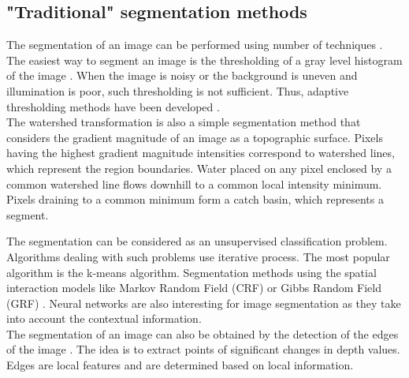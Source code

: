 \subsection{"Traditional" segmentation methods}
The segmentation of an image can be performed using number of techniques \citep{pal1993review}. \\

The easiest way to segment an image is the thresholding of a gray level histogram of the image \citep{taxt1989segmentation}. When the image is noisy or the background is uneven and illumination is poor, such thresholding is not sufficient. Thus, adaptive thresholding methods have been developed \citep{yanowitz1989new}. \\

The watershed transformation is also a simple segmentation method that considers the gradient magnitude of an image as a topographic surface. Pixels having the highest gradient magnitude intensities correspond to watershed lines, which represent the region boundaries. Water placed on any pixel enclosed by a common watershed line flows downhill to a common local intensity minimum. Pixels draining to a common minimum form a catch basin, which represents a segment.

The segmentation can be considered as an unsupervised classification problem. Algorithms dealing with such problems use iterative process. The most popular algorithm is the k-means algorithm. Segmentation methods using the spatial interaction models like Markov Random Field (CRF) \citep{hansen1982image} or Gibbs Random Field (GRF) \citep{derin1987modeling}. Neural networks are also interesting for  image segmentation \citep{ghosh1991image} as they take into account the contextual information. \\

The segmentation of an image can also be obtained by the detection of the edges of the image \citep{peli1982study}. The idea is to extract points of significant changes in depth values. Edges are local features and are determined based on local information. \\

